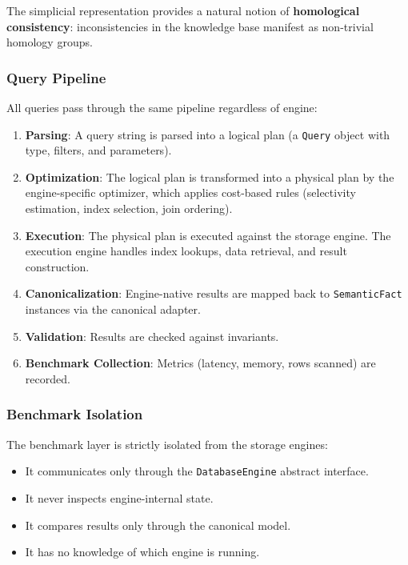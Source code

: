 The simplicial representation provides a natural notion of
\textbf{homological consistency}: inconsistencies in the knowledge base
manifest as non-trivial homology groups.

\subsubsection{Query Pipeline}

All queries pass through the same pipeline regardless of engine:

\begin{enumerate}
    \item \textbf{Parsing}: A query string is parsed into a logical plan
        (a \texttt{Query} object with type, filters, and parameters).
    \item \textbf{Optimization}: The logical plan is transformed into a
        physical plan by the engine-specific optimizer, which applies
        cost-based rules (selectivity estimation, index selection,
        join ordering).
    \item \textbf{Execution}: The physical plan is executed against the
        storage engine.  The execution engine handles index lookups,
        data retrieval, and result construction.
    \item \textbf{Canonicalization}: Engine-native results are mapped
        back to \texttt{SemanticFact} instances via the canonical
        adapter.
    \item \textbf{Validation}: Results are checked against invariants.
    \item \textbf{Benchmark Collection}: Metrics (latency, memory, rows
        scanned) are recorded.
\end{enumerate}

\subsubsection{Benchmark Isolation}

The benchmark layer is strictly isolated from the storage engines:

\begin{itemize}
    \item It communicates only through the \texttt{DatabaseEngine}
        abstract interface.
    \item It never inspects engine-internal state.
    \item It compares results only through the canonical model.
    \item It has no knowledge of which engine is running.
\end{itemize}

